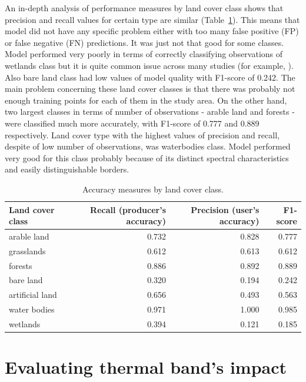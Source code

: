 \documentclass{amuthesis}
\begin{document}
An in-depth analysis of performance measures by land cover class shows
that precision and recall values for certain type are similar
(Table~\ref{tbl-tabela5}). This means that model did not have any
specific problem either with too many false positive (FP) or false
negative (FN) predictions. It was just not that good for some classes.
Model performed very poorly in terms of correctly classifying
observations of wetlands class but it is quite common issue across many
studies (for example, \textcite{malinowski_automated_2020}). Also bare
land class had low values of model quality with F1-score of 0.242. The
main problem concerning these land cover classes is that there was
probably not enough training points for each of them in the study area.
On the other hand, two largest classes in terms of number of
observations - arable land and forests - were classified much more
accurately, with F1-score of 0.777 and 0.889 respectively. Land cover
type with the highest values of precision and recall, despite of low
number of observations, was waterbodies class. Model performed very good
for this class probably because of its distinct spectral characteristics
and easily distinguishable borders.

\hypertarget{tbl-tabela5}{}
\begin{table}
\caption{\label{tbl-tabela5}Accuracy measures by land cover class. }\tabularnewline

\centering
\begin{tabular}{|>{}l|>{}r|>{}r|>{}r|}
\toprule
\textbf{Land cover class} & \textbf{Recall (producer's accuracy)} & \textbf{Precision (user's accuracy)} & \textbf{F1-score}\\
\midrule
arable land & 0.732 & 0.828 & 0.777\\
\hline
grasslands & 0.612 & 0.613 & 0.612\\
\hline
forests & 0.886 & 0.892 & 0.889\\
\hline
bare land & 0.320 & 0.194 & 0.242\\
\hline
artificial land & 0.656 & 0.493 & 0.563\\
\hline
water bodies & 0.971 & 1.000 & 0.985\\
\hline
wetlands & 0.394 & 0.121 & 0.185\\
\bottomrule
\end{tabular}
\end{table}


\hypertarget{sec-results-therm}{%
\chapter{Evaluating thermal band's impact}\label{sec-results-therm}}
\end{document}
